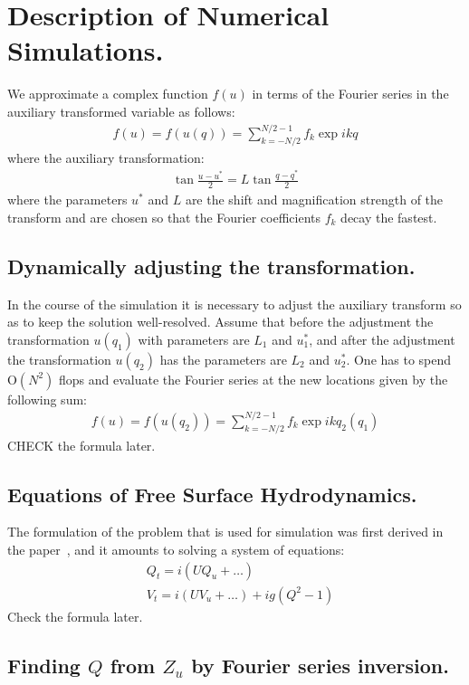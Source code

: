 \documentclass[11pt]{article}
\begin{document}
\section{Description of Numerical Simulations.}
We approximate a complex function $f(u)$ in terms of the Fourier series in the auxiliary transformed variable as 
follows:
\begin{align}
f(u) = f(u(q)) = \sum_{k = -N/2}^{N/2-1} f_k \exp{ikq}
\end{align}
where the auxiliary transformation:
\begin{align}
\tan\frac{u-u^*}{2} = L \tan\frac{q-q^*}{2}
\end{align}
where the parameters $u^*$ and $L$ are the shift and magnification strength of the transform and are chosen so that the 
Fourier coefficients $f_k$ decay the fastest.

\subsection{Dynamically adjusting the transformation.}
In the course of the simulation it is necessary to adjust the auxiliary transform so as to keep the solution well-resolved. 
Assume that before the adjustment the transformation $u(q_1)$ with parameters are $L_1$ and $u_1^*$, and after the adjustment 
the transformation $u(q_2)$ has the parameters are $L_2$ and $u_2^*$. One has to spend O$(N^2)$ flops and evaluate the Fourier 
series at the new locations given by the following sum:
\begin{align}
f(u) = f(u(q_2)) = \sum_{k = -N/2}^{N/2-1} f_k \exp{ikq_2(q_1)}
\end{align}
CHECK the formula later.

\subsection{Equations of Free Surface Hydrodynamics.}
The formulation of the problem that is used for simulation was first derived in the paper~\cite{AIDyachenko2001}, and it amounts 
to solving a system of equations:
\begin{align}
& Q_t = i (UQ_u + \ldots) \\
& V_t = i (UV_u + \ldots) + ig(Q^2-1) 
\end{align}
Check the formula later.

\subsection{Finding $Q$ from $Z_u$ by Fourier series inversion.}
\end{document}
